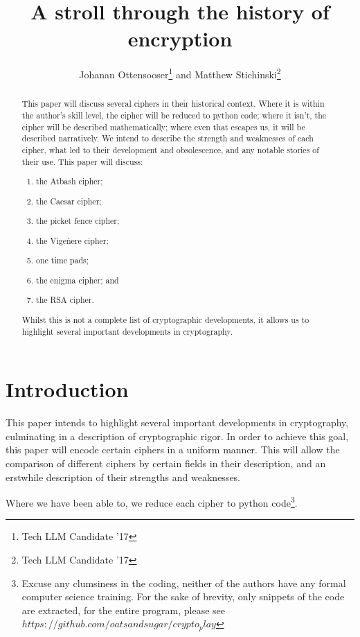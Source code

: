 \documentclass{AIAA}
\begin{document}
\title{A stroll through the history of encryption}

\author{Johanan Ottensooser\footnote{Tech LLM Candidate '17} and Matthew Stichinski\footnote{Tech LLM Candidate '17}}

\begin{abstract}
This paper will discuss several ciphers in their historical context. Where it is within the author's skill level, the cipher will be reduced to python code; where it isn't, the cipher will be described mathematically; where even that escapes us, it will be described narratively. We intend to describe the strength and weaknesses of each cipher, what led to their development and obsolescence, and any notable stories of their use. This paper will discuss:

\begin{enumerate}
    \item the Atbash cipher; 
	\item the Caesar cipher;
    \item the picket fence cipher;
    \item the Vige\`nere cipher;
    \item one time pads;
    \item the enigma cipher; and
    \item the RSA cipher.
\end{enumerate}

Whilst this is not a complete list of cryptographic developments, it allows us to highlight several important developments in cryptography.
\end{abstract}

\maketitle

\section{Introduction}
This paper intends to highlight several important developments in cryptography, culminating in a description of cryptographic rigor. In order to achieve this goal, this paper will encode certain ciphers in a uniform manner. This will allow the comparison of different ciphers by certain fields in their description, and an erstwhile description of their strengths and weaknesses. 

Where we have been able to, we reduce each cipher to python code\footnote{Excuse any clumsiness in the coding, neither of the authors have any formal computer science training. For the sake of brevity, only snippets of the code are extracted, for the entire program, please see $https://github.com/oatsandsugar/crypto_play$}.
\end{document}
